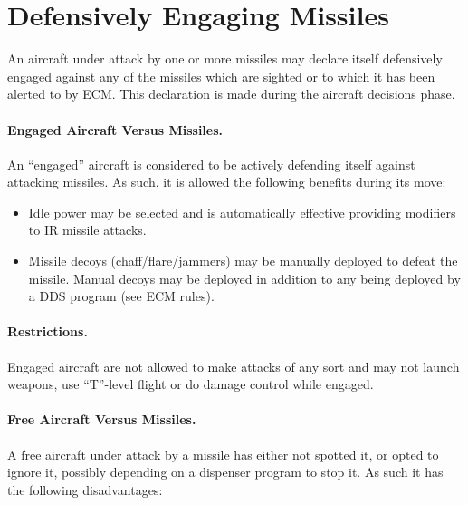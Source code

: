 \section{Defensively Engaging Missiles}
\label{rule:engaging-missiles}

An aircraft under attack by one or more missiles may declare itself defensively engaged against any of the missiles which are sighted or to which it has been alerted to by ECM. This declaration is made during the aircraft decisions phase.

\paragraph{Engaged Aircraft Versus Missiles.} An “engaged” aircraft is considered to be actively defending itself against attacking missiles. As such, it is allowed the following benefits during its move:

\begin{itemize}

    \item Idle power may be selected and is automatically effective providing modifiers to IR missile attacks.

    \item Missile decoys (chaff/flare/jammers) may be manually deployed to defeat the missile. Manual decoys may be deployed in addition to any being deployed by a DDS program (see ECM rules).

    
\end{itemize}

\paragraph{Restrictions.} Engaged aircraft are not allowed to make attacks of any sort and may not launch weapons, use “T”-level flight or do damage control while engaged.

\paragraph{Free Aircraft Versus Missiles.} A free aircraft under attack by a missile has either not spotted it, or opted to ignore it, possibly depending on a dispenser program to stop it. As such it has the following disadvantages:

